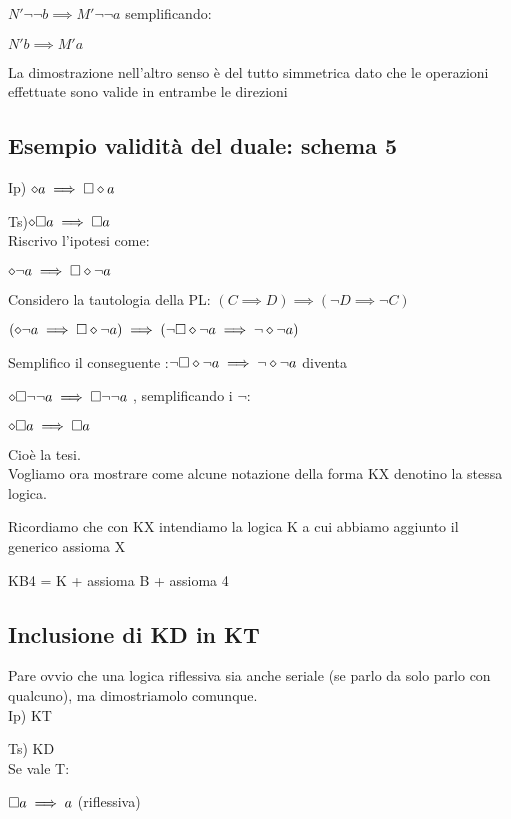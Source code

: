 $N'\neg\neg b\implies M'\neg\neg a$ semplificando:

$N'b\implies M'a$

La dimostrazione nell'altro senso è del tutto simmetrica dato che
le operazioni effettuate sono valide in entrambe le direzioni


\subsection{Esempio validità del duale: schema 5}

Ip) $\diamond a\implies\square\diamond a$

Ts)$\diamond\square a\implies\square a$\\


Riscrivo l'ipotesi come:

$\diamond\neg a\implies\square\diamond\neg a$

Considero la tautologia della PL: $(C\implies D)\implies(\neg D\implies\neg C)$

$(\diamond\neg a\implies\square\diamond\neg a)\implies(\neg\square\diamond\neg a\implies\neg\diamond\neg a)$

Semplifico il conseguente :$\neg\square\diamond\neg a\implies\neg\diamond\neg a$
diventa

$\diamond\square\neg\neg a\implies\square\neg\neg a$ , semplificando
i $\neg$:

$\diamond\square a\implies\square a$

Cioè la tesi.\\


Vogliamo ora mostrare come alcune notazione della forma KX denotino
la stessa logica.

Ricordiamo che con KX intendiamo la logica K a cui abbiamo aggiunto
il generico assioma X

KB4 = K + assioma B + assioma 4


\subsection{Inclusione di KD in KT}

Pare ovvio che una logica riflessiva sia anche seriale (se parlo da
solo parlo con qualcuno), ma dimostriamolo comunque. \\


Ip) KT

Ts) KD\\
Se vale T: 

$\square a\implies a$ (riflessiva)

